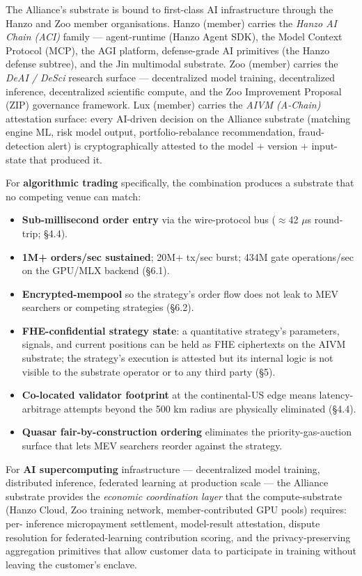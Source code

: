 The Alliance's substrate is bound to first-class AI infrastructure
through the Hanzo and Zoo member organisations. Hanzo (member) carries
the \emph{Hanzo AI Chain (ACI)} family --- agent-runtime
(Hanzo Agent SDK), the Model Context Protocol (MCP), the AGI platform,
defense-grade AI primitives (the Hanzo defense subtree), and the Jin
multimodal substrate. Zoo (member) carries the \emph{DeAI / DeSci}
research surface --- decentralized model training, decentralized
inference, decentralized scientific compute, and the Zoo Improvement
Proposal (ZIP) governance framework. Lux (member) carries the
\emph{AIVM (A-Chain)} attestation surface: every AI-driven decision on
the Alliance substrate (matching engine ML, risk model output,
portfolio-rebalance recommendation, fraud-detection alert) is
cryptographically attested to the model + version + input-state that
produced it.

For \textbf{algorithmic trading} specifically, the combination produces a
substrate that no competing venue can match:

\begin{itemize}[leftmargin=2em,itemsep=0.1em]
\item \textbf{Sub-millisecond order entry} via the wire-protocol bus
($\approx$42 $\mu$s round-trip; \S 4.4).
\item \textbf{1M+ orders/sec sustained}; 20M+ tx/sec burst; 434M gate
operations/sec on the GPU/MLX backend (\S 6.1).
\item \textbf{Encrypted-mempool} so the strategy's order flow does not
leak to MEV searchers or competing strategies (\S 6.2).
\item \textbf{FHE-confidential strategy state}: a quantitative
strategy's parameters, signals, and current positions can be held as
FHE ciphertexts on the AIVM substrate; the strategy's execution is
attested but its internal logic is not visible to the substrate
operator or to any third party (\S 5).
\item \textbf{Co-located validator footprint} at the continental-US
edge means latency-arbitrage attempts beyond the 500 km radius are
physically eliminated (\S 4.4).
\item \textbf{Quasar fair-by-construction ordering} eliminates the
priority-gas-auction surface that lets MEV searchers reorder against
the strategy.
\end{itemize}

For \textbf{AI supercomputing} infrastructure --- decentralized model
training, distributed inference, federated learning at production
scale --- the Alliance substrate provides the \emph{economic
coordination layer} that the compute-substrate (Hanzo Cloud, Zoo
training network, member-contributed GPU pools) requires: per-
inference micropayment settlement, model-result attestation, dispute
resolution for federated-learning contribution scoring, and the
privacy-preserving aggregation primitives that allow customer data to
participate in training without leaving the customer's enclave.

